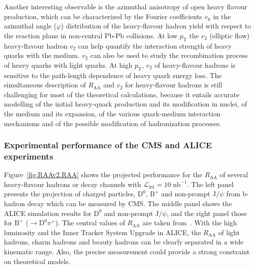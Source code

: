 Another interesting observable is the azimuthal anisotropy of open heavy flavour production, which can be characterized by the Fourier coefficients $v_{\mathrm{n}}$ in the azimuthal angle ($\varphi$) distribution of the heavy-flavour hadron yield with respect to the reaction plane in non-central Pb-Pb collisions. At low $p_{\mathrm{T}}$ the $v_{2}$ (elliptic flow) heavy-flavour hadron $v_{2}$ can help quantify the interaction strength of heavy quarks with the medium. $v_{2}$ can also be used to study the recombination process of heavy quarks with light quarks. At high $p_{\mathrm{T}}$, $v_{2}$ of heavy-flavour hadrons is sensitive to the path-length dependence of heavy quark energy loss. The simultaneous description of $R_{\mathrm{AA}}$ and $v_{2}$ for heavy-flavour hadrons is still challenging for most of the theoretical calculations, because it entails accurate modelling of the initial heavy-quark production and its modification in nuclei, of the medium and its expansion, of the various quark-medium interaction mechanisms and of the possible modification of hadronization processes.


\subsubsection{Experimental performance of the CMS and ALICE experiments}

Figure~\ref{fig:RAAv2.RAA} shows the projected performance for the $R_{\mathrm{AA}}$ of several heavy-flavour hadrons or decay channels with $\mathcal{L}_{\mathrm{int}}=10\;\mathrm{nb}^{-1}$. The left panel presents the projection of charged particles, $\mathrm{D}^{0}$, $\mathrm{B}^{+}$ and non-prompt J$/\psi$ from b-hadron decay which can be measured by CMS. The middle panel shows the ALICE simulation results for $\mathrm{D}^{0}$ and non-prompt J$/\psi$, and the right panel those for $\mathrm{B}^{+}$ ($\rightarrow \mathrm{D}^{0}\pi^{+}$). The central values of $R_{\mathrm{AA}}$ are taken from~\cite{raatheory}. With the high luminosity and the Inner Tracker System Upgrade in ALICE, the $R_{\mathrm{AA}}$ of light hadrons, charm hadrons and beauty hadrons can be clearly separated in a wide kinematic range. Also, the precise measurement could provide a strong constraint on theoretical models.

